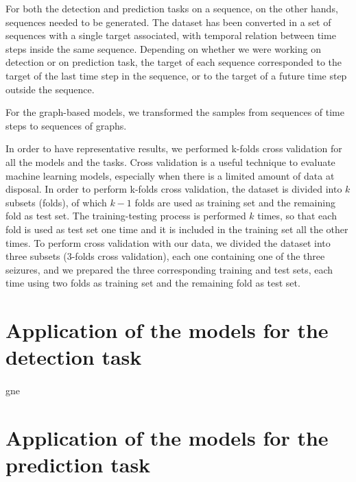 For both the detection and prediction tasks on a sequence, on the other hands, sequences needed to be generated. The dataset has been converted in a set of sequences with a single target associated, with temporal relation between time steps inside the same sequence. Depending on whether we were working on detection or on prediction task, the target of each sequence corresponded to the target of the last time step in the sequence, or to the target of a future time step outside the sequence.

For the graph-based models, we transformed the samples from sequences of time steps to sequences of graphs.

In order to have representative results, we performed k-folds cross validation for all the models and the tasks. Cross validation is a useful technique to evaluate machine learning models, especially when there is a limited amount of data at disposal. In order to perform k-folds cross validation, the dataset is divided into $k$ subsets (folds), of which $k-1$ folds are used as training set and the remaining fold as test set. The training-testing process is performed $k$ times, so that each fold is used as test set one time and it is included in the training set all the other times. To perform cross validation with our data, we divided the dataset into three subsets (3-folds cross validation), each one containing one of the three seizures, and we prepared the three corresponding training and test sets, each time using two folds as training set and the remaining fold as test set.


\section{Application of the models for the detection task} \label{sec: step_models_detection_task}
\paragraph{} gne


\section{Application of the models for the prediction task} \label{sec: step_models_prediction_task}
